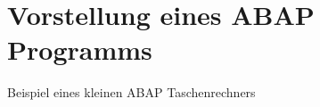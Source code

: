 \section{Vorstellung eines ABAP Programms}

\begin{listing}[ht]{}
    \caption{Beispiel eines kleinen ABAP Taschenrechners}
    \label{listing:abap_taschenrechner}
\end{listing}